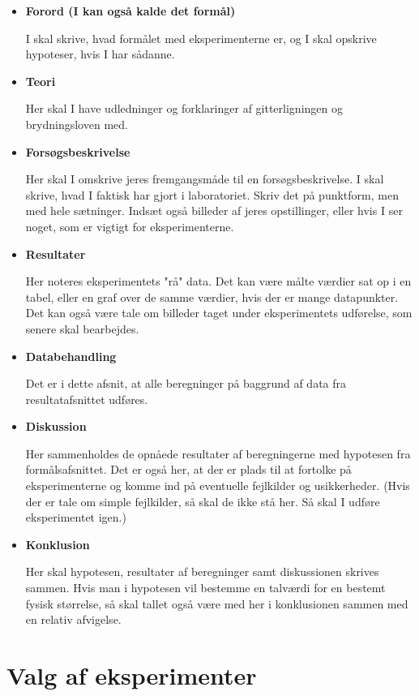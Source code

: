 \documentclass[a4paper, 12pt]{article}
\begin{document}
\begin{itemize}
\item \textbf{Forord (I kan også kalde det formål)}

I skal skrive, hvad formålet med eksperimenterne er, og I skal opskrive hypoteser, hvis I har sådanne.

\item \textbf{Teori}

Her skal I have udledninger og forklaringer af gitterligningen og brydningsloven med.

\item \textbf{Forsøgsbeskrivelse}

Her skal I omskrive jeres fremgangsmåde til en forsøgsbeskrivelse. I skal skrive, hvad I faktisk har gjort i laboratoriet. Skriv det på punktform, men med hele sætninger. Indsæt også billeder af jeres opstillinger, eller hvis I ser noget, som er vigtigt for eksperimenterne.

\item \textbf{Resultater}

Her noteres eksperimentets "rå" data. Det kan være målte værdier sat op i en tabel, eller en graf over de samme værdier, hvis der er mange datapunkter. Det kan også være tale om billeder taget under eksperimentets udførelse, som senere skal bearbejdes.

\item \textbf{Databehandling}

Det er i dette afsnit, at alle beregninger på baggrund af data fra resultatafsnittet udføres.

\item \textbf{Diskussion}

Her sammenholdes de opnåede resultater af beregningerne med hypotesen fra formålsafsnittet. Det er også her, at der er plads til at fortolke på eksperimenterne og komme ind på eventuelle fejlkilder og usikkerheder. (Hvis der er tale om simple fejlkilder, så skal de ikke stå her. Så skal I udføre eksperimentet igen.)

\item \textbf{Konklusion}

Her skal hypotesen, resultater af beregninger samt diskussionen skrives sammen. Hvis man i hypotesen vil bestemme en talværdi for en bestemt fysisk størrelse, så skal tallet også være med her i konklusionen sammen med en relativ afvigelse.
\end{itemize}
\section*{Valg af eksperimenter}
\label{sec:org4a16140}
\end{document}
